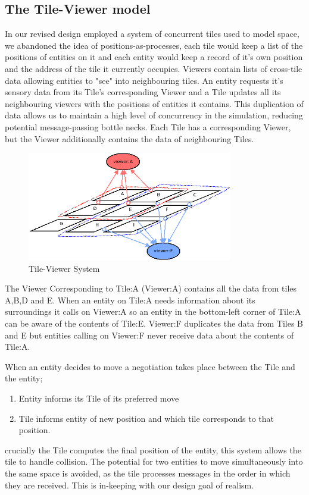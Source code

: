 \subsection{The Tile-Viewer model}
\label{tile_viewer_diagram}
In our revised design employed a system of concurrent tiles used to model space, we abandoned the idea of positions-as-processes, each tile would keep a list of the positions of entities on it and each entity would keep a record of it's own position and the address of the tile it currently occupies. Viewers contain lists of cross-tile data allowing entities to "see" into neighbouring tiles. An entity requests it's sensory data from its Tile's corresponding Viewer and a Tile updates all its neighbouring viewers with the positions of entities it contains. This duplication of data allows us to maintain a high level of concurrency in the simulation, reducing potential message-passing bottle necks. Each Tile has a corresponding Viewer, but the Viewer additionally contains the data of neighbouring Tiles.
\begin{figure}[h]
  \centering
  \includegraphics[width=0.8\textwidth]{img/tile_to_viewer_map.png}
\caption{Tile-Viewer System}
    \label{fig:Tile-Viewer System}
\end{figure}
The Viewer Corresponding to Tile:A (Viewer:A) contains all the data from tiles A,B,D and E. When an entity on Tile:A needs information about its surroundings it calls on Viewer:A so an entity in the bottom-left corner of Tile:A can be aware of the contents of Tile:E. Viewer:F duplicates the data from Tiles B and E but entities calling on Viewer:F never receive data about the contents of Tile:A.

When an entity decides to move a negotiation takes place between the Tile and the entity;
\begin{enumerate}
\item{Entity informs its Tile of its preferred move}
\item{Tile informs entity of new position and which tile corresponds to that position.}
\end{enumerate}
crucially the Tile computes the final position of the entity, this system allows the tile to handle collision. The potential for two entities to move simultaneously into the same space is avoided, as the tile processes messages in the order in which they are received. This is in-keeping with our design goal of realism.

